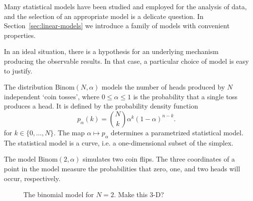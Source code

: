\documentclass[cclicense]{hmcthesis}
\numberwithin{equation}{chapter}
\numberwithin{thmcounter}{chapter}
\begin{document}
    Many statistical models have been studied and employed for the analysis of
    data, and the selection of an appropriate model is a delicate question.  In
    Section~\ref{sec:linear-models} we introduce a family of models with
    convenient properties.

    In an ideal situation, there is a hypothesis for an underlying mechanism
    producing the observable results.  In that case, a particular choice of
    model is easy to justify.

    \begin{example}

        The distribution $\mathrm{Binom}(N, \alpha)$ models the number of heads
        produced by $N$ independent `coin tosses', where \mbox{$0 \le \alpha \le
        1$} is the probability that a single toss produces a head.  It is
        defined by the probability density function
        \[
            p_\alpha(k) = {N \choose k} \alpha^k(1-\alpha)^{n-k}.
        \]
        for $k \in \{0, \ldots, N\}$.  The map $\alpha \mapsto p_\alpha$
        determines a parametrized statistical model.  The statistical model is a
        curve, i.e. a one-dimensional subset of the simplex.  

        The model $\mathrm{Binom}(2, \alpha)$ simulates two coin flips.  The
        three coordinates of a point in the model measure the probabilities that
        zero, one, and two heads will occur, respectively.

        \begin{figure}[H]
            \centering
            \vspace*{-0.2cm}
            \vspace*{-0.5cm}
            \caption{The binomial model for $N=2$. Make this 3-D?}
            \label{fig:binomial}
        \end{figure}


\end{example}
\end{document}
